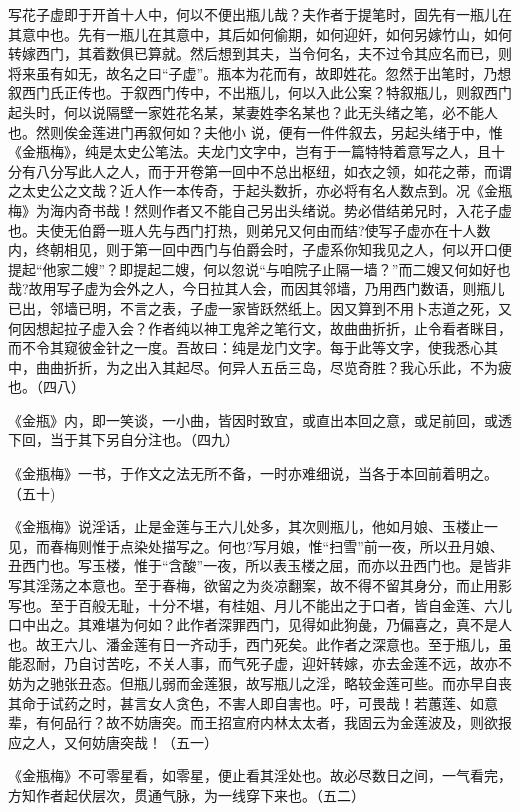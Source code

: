 {写花子虚即于开首十人中，何以不便出瓶儿哉？夫作者于提笔时，固先有一瓶儿在其意中也。先有一瓶儿在其意中，其后如何偷期，如何迎奸，如何另嫁竹山，如何转嫁西门，其着数俱已算就。然后想到其夫，当令何名，夫不过令其应名而已，则将来虽有如无，故名之曰“子虚”。瓶本为花而有，故即姓花。忽然于出笔时，乃想叙西门氏正传也。于叙西门传中，不出瓶儿，何以入此公案？特叙瓶儿，则叙西门起头时，何以说隔壁一家姓花名某，某妻姓李名某也？此无头绪之笔，必不能人也。然则俟金莲进门再叙何如？夫他小
说，便有一件件叙去，另起头绪于中，惟《金瓶梅》，纯是太史公笔法。夫龙门文字中，岂有于一篇特特着意写之人，且十分有八分写此人之人，而于开卷第一回中不总出枢纽，如衣之领，如花之蒂，而谓之太史公之文哉？近人作一本传奇，于起头数折，亦必将有名人数点到。况《金瓶梅》为海内奇书哉！然则作者又不能自己另出头绪说。势必借结弟兄时，入花子虚也。夫使无伯爵一班人先与西门打热，则弟兄又何由而结?使写子虚亦在十人数内，终朝相见，则于第一回中西门与伯爵会时，子虚系你知我见之人，何以开口便提起“他家二嫂”？即提起二嫂，何以忽说“与咱院子止隔一墙？”而二嫂又何如好也哉?故用写子虚为会外之人，今日拉其人会，而因其邻墙，乃用西门数语，则瓶儿已出，邻墙已明，不言之表，子虚一家皆跃然纸上。因又算到不用卜志道之死，又何因想起拉子虚入会？作者纯以神工鬼斧之笔行文，故曲曲折折，止令看者眯目，而不令其窥彼金针之一度。吾故曰：纯是龙门文字。每于此等文字，使我悉心其中，曲曲折折，为之出入其起尽。何异人五岳三岛，尽览奇胜？我心乐此，不为疲也。（四八）

《金瓶》内，即一笑谈，一小曲，皆因时致宜，或直出本回之意，或足前回，或透下回，当于其下另自分注也。（四九）

《金瓶梅》一书，于作文之法无所不备，一时亦难细说，当各于本回前着明之。（五十)

《金瓶梅》说淫话，止是金莲与王六儿处多，其次则瓶儿，他如月娘、玉楼止一见，而春梅则惟于点染处描写之。何也?写月娘，惟“扫雪”前一夜，所以丑月娘、丑西门也。写玉楼，惟于“含酸”一夜，所以表玉楼之屈，而亦以丑西门也。是皆非写其淫荡之本意也。至于春梅，欲留之为炎凉翻案，故不得不留其身分，而止用影写也。至于百般无耻，十分不堪，有桂姐、月儿不能出之于口者，皆自金莲、六儿口中出之。其难堪为何如？此作者深罪西门，见得如此狗彘，乃偏喜之，真不是人也。故王六儿、潘金莲有日一齐动手，西门死矣。此作者之深意也。至于瓶儿，虽能忍耐，乃自讨苦吃，不关人事，而气死子虚，迎奸转嫁，亦去金莲不远，故亦不妨为之驰张丑态。但瓶儿弱而金莲狠，故写瓶儿之淫，略较金莲可些。而亦早自丧其命于试药之时，甚言女人贪色，不害人即自害也。吁，可畏哉！若蕙莲、如意辈，有何品行？故不妨唐突。而王招宣府内林太太者，我固云为金莲波及，则欲报应之人，又何妨唐突哉！（五一）

《金瓶梅》不可零星看，如零星，便止看其淫处也。故必尽数日之间，一气看完，方知作者起伏层次，贯通气脉，为一线穿下来也。（五二）

}
